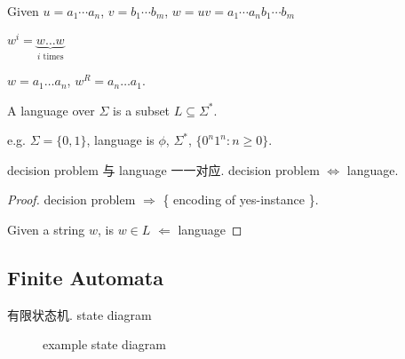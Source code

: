 \begin{definition}[Concatenation]
    Given $u=a_1\cdots a_n$, $v=b_1\cdots b_m$, $w=uv=a_1\cdots a_n b_1 \cdots b_m$
\end{definition}

\begin{definition}[exponentiation(幂)]
    $w^i=\underbrace{w\dots w}_{i \text{ times}}$
\end{definition} 

\begin{definition}[reversal]
    $w=a_1\dots a_n$, $w^R=a_n\dots a_1$. 
\end{definition}

\begin{definition}[Language]
    A language over $\Sigma$ is a subset $L \subseteq  \Sigma^*$. 
\end{definition}

e.g. $\Sigma=\{ 0,1 \}$, language is $\phi$, $\Sigma^*$, $\{ 0^n 1^n : n\ge 0 \}$. 

decision problem 与 language 一一对应. decision problem $\Leftrightarrow$ language. 
\begin{proof}
    decision problem $\Rightarrow$ \{ encoding of yes-instance \}. 

    Given a string $w$, is $w\in L$ $\Leftarrow$ language
\end{proof}

\subsection{Finite Automata}
有限状态机. state diagram

\begin{figure}[!htb]
    \centering
    \caption{example state diagram}
\end{figure}

